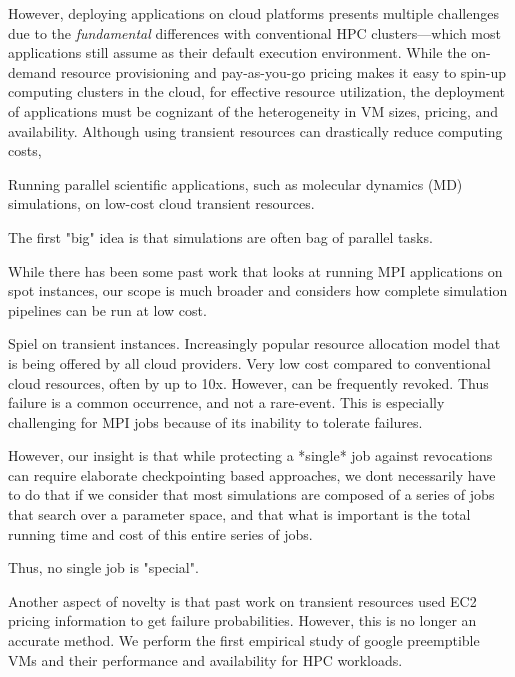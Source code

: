
However, deploying applications on cloud platforms presents multiple challenges due to the  \emph{fundamental} differences with conventional HPC clusters---which most applications still assume as their default execution environment.
%
While the on-demand resource provisioning and pay-as-you-go pricing makes it easy to spin-up computing clusters in the cloud, for effective resource utilization, the deployment of applications must be cognizant of the heterogeneity in VM sizes, pricing, and availability.
%
Although using transient resources can drastically reduce computing costs, 


% 








Running parallel scientific applications, such as molecular dynamics (MD) simulations, on low-cost cloud transient resources. 

The first "big" idea is that simulations are often bag of parallel tasks. 

While there has been some past work that looks at running MPI applications on spot instances, our scope is much broader and considers how complete simulation pipelines can be run at low cost. 

Spiel on transient instances. Increasingly popular resource allocation model that is being offered by all cloud providers. 
Very low cost compared to conventional cloud resources, often by up to 10x. 
However, can be frequently revoked. 
Thus failure is a common occurrence, and not a rare-event. 
This is especially challenging for MPI jobs because of its inability to tolerate failures. 

However, our insight is that while protecting a *single* job against revocations can require elaborate checkpointing based approaches, we dont necessarily have to do that if we consider that most simulations are composed of a series of jobs that search over a parameter space, and that what is important is the total running time and cost of this entire series of jobs. 

Thus, no single job is "special". 

Another aspect of novelty is that past work on transient resources used EC2 pricing information to get failure probabilities. However, this is no longer an accurate method. We perform the first empirical study of google preemptible VMs and their performance and availability for HPC workloads. 

